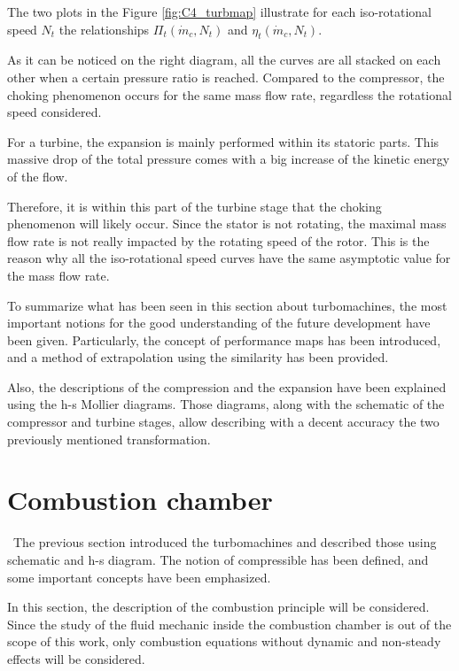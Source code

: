 The two plots in the Figure \ref{fig:C4_turbmap} illustrate for each iso-rotational speed \(N_t\) the relationships \(\Pi_t(\dot{m}_c,N_t)\) and \(\eta_t(\dot{m}_c,N_t)\). 

As it can be noticed on the right diagram, all the curves are all stacked on each other when a certain pressure ratio is reached. Compared to the compressor, the choking phenomenon occurs for the same mass flow rate, regardless the rotational speed considered. 

For a turbine, the expansion is mainly performed within its statoric parts. This massive drop of the total pressure comes with a big increase of the kinetic energy of the flow. 

Therefore, it is within this part of the turbine stage that the choking phenomenon will likely occur. Since the stator is not rotating, the maximal mass flow rate is not really impacted by the rotating speed of the rotor. This is the reason why all the iso-rotational speed curves have the same asymptotic value for the mass flow rate.


To summarize what has been seen in this section about turbomachines, the most important notions for the good understanding of the future development have been given. Particularly, the concept of performance maps has been introduced, and a method of extrapolation using the similarity has been provided.

Also, the descriptions of the compression and the expansion have been explained using the h-s Mollier diagrams. Those diagrams, along with the schematic of the compressor and turbine stages, allow describing with a decent accuracy the two previously mentioned transformation.

\newpage
\section{Combustion chamber}
\quad\ The previous section introduced the turbomachines and described those using schematic and h-s diagram. The notion of compressible has been defined, and some important concepts have been emphasized.

In this section, the description of the combustion principle will be considered. Since the study of the fluid mechanic inside the combustion chamber is out of the scope of this work, only combustion equations without dynamic and non-steady effects will be considered.

